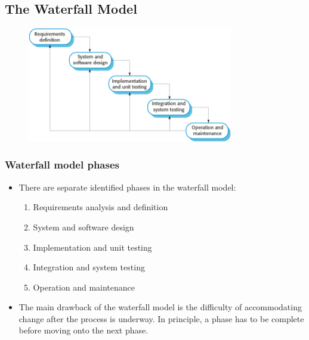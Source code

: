 \subsection{The Waterfall Model}
\begin{figure}[h!]
    \centering
    \includegraphics[width = 0.8\textwidth]{./figures/waterfall_L1_1.png}
    \caption{}
    \label{fig:L1_1}
\end{figure}

\subsubsection{Waterfall model phases}
\begin{itemize}
  \item There are separate identified phases in the waterfall model:
  \begin{enumerate}
    \item Requirements analysis and definition
    \item System and software design
    \item Implementation and unit testing
    \item Integration and system testing
    \item Operation and maintenance
  \end{enumerate}
  \item The main drawback of the waterfall model is the difficulty of accommodating change after the process is underway. In principle, a phase has to be complete before moving onto the next phase.

\end{itemize}


